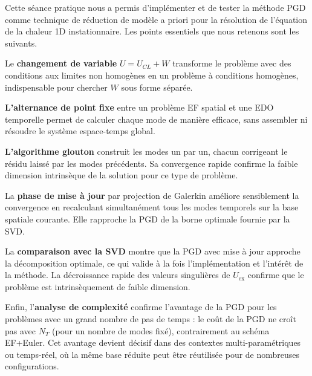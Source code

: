 \documentclass[11pt,a4paper]{article}
\begin{document}
Cette séance pratique nous a permis d'implémenter et de tester la méthode PGD
comme technique de réduction de modèle a priori pour la résolution de l'équation
de la chaleur 1D instationnaire. Les points essentiels que nous retenons sont
les suivants.

Le \textbf{changement de variable} $U = U_{CL} + W$ transforme le problème avec des
conditions aux limites non homogènes en un problème à conditions homogènes,
indispensable pour chercher $W$ sous forme séparée.

\textbf{L'alternance de point fixe} entre un problème EF spatial et une EDO temporelle
permet de calculer chaque mode de manière efficace, sans assembler ni résoudre
le système espace-temps global.

\textbf{L'algorithme glouton} construit les modes un par un, chacun corrigeant le résidu
laissé par les modes précédents. Sa convergence rapide confirme la faible dimension
intrinsèque de la solution pour ce type de problème.

La \textbf{phase de mise à jour} par projection de Galerkin améliore sensiblement la
convergence en recalculant simultanément tous les modes temporels sur la base spatiale
courante. Elle rapproche la PGD de la borne optimale fournie par la SVD.

La \textbf{comparaison avec la SVD} montre que la PGD avec mise à jour approche la
décomposition optimale, ce qui valide à la fois l'implémentation et l'intérêt de la
méthode. La décroissance rapide des valeurs singulières de $U_{\text{ex}}$ confirme
que le problème est intrinsèquement de faible dimension.

Enfin, l'\textbf{analyse de complexité} confirme l'avantage de la PGD pour les problèmes
avec un grand nombre de pas de temps : le coût de la PGD ne croît pas avec $N_T$
(pour un nombre de modes fixé), contrairement au schéma EF+Euler.
Cet avantage devient décisif dans des contextes multi-paramétriques ou temps-réel,
où la même base réduite peut être réutilisée pour de nombreuses configurations.
\end{document}
